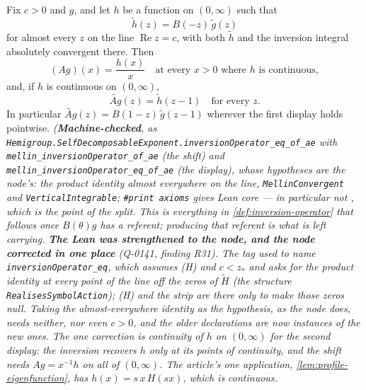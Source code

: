 \begin{lemma}\label{lem:inversion-operator-action}
\leanok
Fix $c > 0$ and $g$, and let $h$ be a function on $(0,\infty)$ such that
\[
  \tilde h(z) = B(-z)\,\tilde g(z)
\]
for almost every $z$ on the line $\operatorname{Re} z = c$, with both $\tilde h$ and the inversion integral
absolutely convergent there. Then
\[
  (A g)(x) = \frac{h(x)}{x} \quad\text{at every } x > 0 \text{ where } h \text{ is continuous},
\]
and, if $h$ is continuous on $(0,\infty)$,
\[
  \widetilde{A g}(z) = \tilde h(z-1) \quad\text{for every } z .
\]
In particular $\widetilde{A g}(z) = B(1-z)\,\tilde g(z-1)$ wherever the first display holds pointwise.
\statusT\quad\emph{(\textbf{Machine-checked}, as
\texttt{Hemigroup.SelfDecomposableExponent.inversionOperator\_eq\_of\_ae} with
\texttt{mellin\_inversionOperator\_of\_ae} (the shift) and \texttt{mellin\_inversionOperator\_eq\_of\_ae}
(the display), whose hypotheses are the node's: the product identity almost everywhere on the
line, \texttt{MellinConvergent} and \texttt{VerticalIntegrable};
\texttt{\#print axioms} gives Lean core --- in particular \emph{not} ,
which is the point of the split. This is everything in \ref{def:inversion-operator} that follows
once $B(\theta)g$ has a referent; producing that referent is what  is left carrying.
\textbf{The Lean was strengthened to the node, and the node corrected in one place} (Q-0141,
finding R31). The tag used to name \texttt{inversionOperator\_eq}, which assumes (H) and
$c < z_*$ and asks for the product identity at every point of the line off the zeros of $\tilde H$
(the structure \texttt{RealisesSymbolAction}); (H) and the strip are there only to make those zeros
null. Taking the almost-everywhere identity as the hypothesis, as the node does, needs neither, nor
even $c > 0$, and the older declarations are now instances of the new ones. The one correction is
continuity of $h$ on $(0,\infty)$ for the second display: the inversion recovers $h$ only at its
points of continuity, and the shift needs $Ag = x^{-1}h$ on all of $(0,\infty)$. The article's one
application, \ref{lem:profile-eigenfunction}, has $h(x) = s\,x\,H(sx)$, which is continuous.}


\end{lemma}
